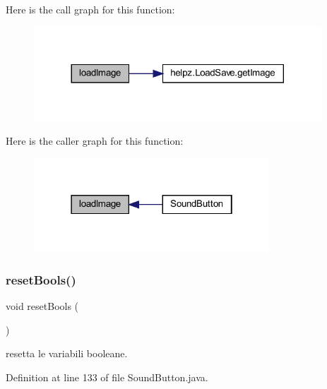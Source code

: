 Here is the call graph for this function\+:\nopagebreak
\begin{figure}[H]
\begin{center}
\leavevmode
\includegraphics[width=305pt]{classui_1_1_sound_button_aeee4cf1bbe51fdc2f9c344e4c20cee76_cgraph}
\end{center}
\end{figure}
Here is the caller graph for this function\+:\nopagebreak
\begin{figure}[H]
\begin{center}
\leavevmode
\includegraphics[width=250pt]{classui_1_1_sound_button_aeee4cf1bbe51fdc2f9c344e4c20cee76_icgraph}
\end{center}
\end{figure}
\mbox{\label{classui_1_1_sound_button_a4506144774b5a18385cf2eb0f4ff5e42}} 
\subsubsection{\texorpdfstring{reset\+Bools()}{resetBools()}}
{\footnotesize\ttfamily void reset\+Bools (\begin{DoxyParamCaption}{ }\end{DoxyParamCaption})}



resetta le variabili booleane. 



Definition at line 133 of file Sound\+Button.\+java.

\mbox{\label{classui_1_1_sound_button_ad6f3328519bbc954f7973bc885d088d8}} 
